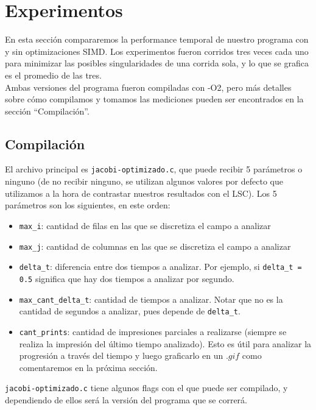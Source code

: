 \documentclass[a4paper]{article}
\begin{document}
\newpage
\section{Experimentos}

En esta sección compararemos la performance temporal de nuestro 
programa con y sin optimizaciones SIMD. Los experimentos fueron corridos tres veces cada uno para minimizar las
posibles singularidades de una corrida sola, y lo que se grafica es el
promedio de las tres.\\

Ambas versiones del programa fueron compiladas con -O2, pero más detalles
sobre cómo compilamos y tomamos las mediciones pueden ser encontrados en la
sección ``Compilación''.

\subsection{Compilación}

El archivo principal es \texttt{jacobi-optimizado.c}, que puede recibir
5 parámetros o ninguno (de no recibir ninguno, se utilizan algunos valores
por defecto que utilizamos a la hora de contrastar nuestros resultados
con el LSC). Los 5 parámetros son los siguientes, en este orden:

\begin{itemize}
\item \texttt{max\_i}: cantidad de filas en las que se discretiza el campo
a analizar
\item \texttt{max\_j}: cantidad de columnas en las que se discretiza el campo
a analizar
\item \texttt{delta\_t}: diferencia entre dos tiempos a analizar. Por ejemplo,
si \texttt{delta\_t = 0.5} significa que hay dos
tiempos a analizar por segundo.
\item \texttt{max\_cant\_delta\_t}: cantidad de tiempos a analizar.
Notar que no es la cantidad de segundos a analizar, pues depende 
de \texttt{delta\_t}.
\item \texttt{cant\_prints}: cantidad de impresiones parciales a 
realizarse (siempre se realiza la impresión del último tiempo 
analizado). Esto es útil para analizar la progresión a través del 
tiempo y luego graficarlo en un $.gif$ como comentaremos en la 
próxima sección.
\end{itemize}


\texttt{jacobi-optimizado.c} tiene algunos
flags con el que puede ser compilado, y dependiendo de ellos será la
versión del programa que se correrá. \\
\end{document}
